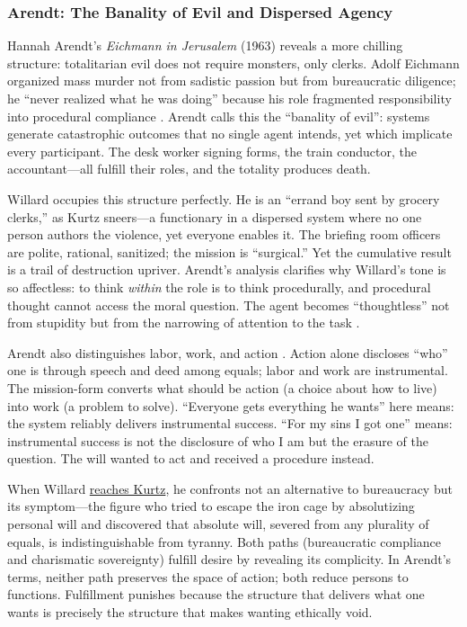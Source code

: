 \subsubsection*{Arendt: The Banality of Evil and Dispersed Agency}
Hannah Arendt's \textit{Eichmann in Jerusalem} (1963) reveals a more chilling structure:
totalitarian evil does not require monsters, only clerks. Adolf Eichmann organized mass murder
not from sadistic passion but from bureaucratic diligence; he ``never realized what he was
doing'' because his role fragmented responsibility into procedural compliance
\parencite{ArendtEichmann1963}. Arendt calls this the ``banality of evil'': systems generate
catastrophic outcomes that no single agent intends, yet which implicate every participant. The
desk worker signing forms, the train conductor, the accountant---all fulfill their roles, and
the totality produces death.

Willard occupies this structure perfectly. He is an ``errand boy sent by grocery clerks,'' as
Kurtz sneers---a functionary in a dispersed system where no one person authors the violence,
yet everyone enables it. The briefing room officers are polite, rational, sanitized; the
mission is ``surgical.'' Yet the cumulative result is a trail of destruction upriver. Arendt's
analysis clarifies why Willard's tone is so affectless: to think \emph{within} the role is to
think procedurally, and procedural thought cannot access the moral question. The agent becomes
``thoughtless'' not from stupidity but from the narrowing of attention to the task
\parencite{ArendtEichmann1963}.

Arendt also distinguishes labor, work, and action \parencite{ArendtHC1958}. Action alone
discloses ``who'' one is through speech and deed among equals; labor and work are instrumental.
The mission-form converts what should be action (a choice about how to live) into work (a
problem to solve). ``Everyone gets everything he wants'' here means: the system reliably
delivers instrumental success. ``For my sins I got one'' means: instrumental success is not the
disclosure of who I am but the erasure of the question. The will wanted to act and received a
procedure instead.

When Willard \hyperref[scene:kurtz-compound]{reaches Kurtz}, he confronts not an alternative
to bureaucracy but its symptom---the figure who tried to escape the iron cage by absolutizing
personal will and
discovered that absolute will, severed from any plurality of equals, is indistinguishable from
tyranny. Both paths (bureaucratic compliance and charismatic sovereignty) fulfill desire by
revealing its complicity. In Arendt's terms, neither path preserves the space of action; both
reduce persons to functions. Fulfillment punishes because the structure that delivers what one
wants is precisely the structure that makes wanting ethically void.
